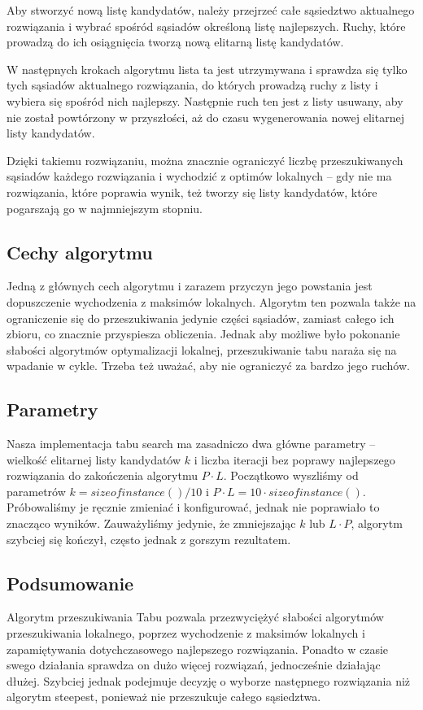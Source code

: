 Aby stworzyć nową listę kandydatów, należy przejrzeć całe sąsiedztwo aktualnego rozwiązania i wybrać spośród sąsiadów określoną listę najlepszych. Ruchy, które prowadzą do ich osiągnięcia tworzą nową elitarną listę kandydatów.

W następnych krokach algorytmu lista ta jest utrzymywana i sprawdza się tylko tych sąsiadów aktualnego rozwiązania, do których prowadzą ruchy z listy i wybiera się spośród nich najlepszy. Następnie ruch ten jest z listy usuwany, aby nie został powtórzony w przyszłości, aż do czasu wygenerowania nowej elitarnej listy kandydatów.

Dzięki takiemu rozwiązaniu, można znacznie ograniczyć liczbę przeszukiwanych sąsiadów każdego rozwiązania i wychodzić z optimów lokalnych -- gdy nie ma rozwiązania, które poprawia wynik, też tworzy się listy kandydatów, które pogarszają go w najmniejszym stopniu.

\subsection{Cechy algorytmu}

Jedną z głównych cech algorytmu i zarazem przyczyn jego powstania jest dopuszczenie wychodzenia z maksimów lokalnych. Algorytm ten pozwala także na ograniczenie się do przeszukiwania jedynie części sąsiadów, zamiast całego ich zbioru, co znacznie przyspiesza obliczenia. Jednak aby możliwe było pokonanie słabości algorytmów optymalizacji lokalnej, przeszukiwanie tabu naraża się na wpadanie w cykle. Trzeba też uważać, aby nie ograniczyć za bardzo jego ruchów.

\subsection{Parametry}

Nasza implementacja tabu search ma zasadniczo dwa główne parametry -- wielkość elitarnej listy kandydatów $k$ i liczba iteracji bez poprawy najlepszego rozwiązania do zakończenia algorytmu $P \cdot L$.
Początkowo wyszliśmy od parametrów $k = sizeofinstance() / 10$ i $P \cdot L = 10 \cdot sizeofinstance()$. Próbowaliśmy je ręcznie zmieniać i konfigurować, jednak nie poprawiało to znacząco wyników. Zauważyliśmy jedynie, że zmniejszając $k$ lub $L \cdot P$, algorytm szybciej się kończył, często jednak z gorszym rezultatem.

\subsection{Podsumowanie}

Algorytm przeszukiwania Tabu pozwala przezwyciężyć słabości algorytmów przeszukiwania lokalnego, poprzez wychodzenie z maksimów lokalnych i zapamiętywania dotychczasowego najlepszego rozwiązania. Ponadto w czasie swego działania sprawdza on dużo więcej rozwiązań, jednocześnie działając dłużej. Szybciej jednak podejmuje decyzję o wyborze następnego rozwiązania niż algorytm steepest, ponieważ nie przeszukuje całego sąsiedztwa.
